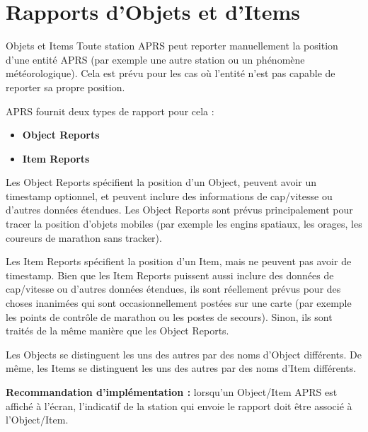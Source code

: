 \chapter[RAPPORTS D'OBJETS ET D'ITEMS]{Rapports d'Objets et d'Items}\label{rapports-dobjets-et-ditems}

\newcommand{\chElevenHead}[1]{\shortstack{\sffamily\bfseries\itshape #1}}
\newcommand{\chElevenDataExtHead}{%
  \makebox[\linewidth][c]{%
  \begin{tabular}{@{}>{\centering\arraybackslash\sffamily\bfseries\itshape}p{\dimexpr\linewidth+2\tabcolsep\relax}@{}}
  Course/Speed \\
  \hline
  Power/Height/Gain/Dir \\
  \hline
  Radio Range \\
  \hline
  DF Signal Strength \\
  \hline
  Area Object
  \end{tabular}}%
}
\newcommand{\chElevenBytes}[1]{%
  \makebox[0pt][r]{Bytes:\hspace{1.2em}}%
  \makebox[\linewidth][c]{#1}%
}
\newcommand{\chElevenExampleText}[1]{{\rmfamily\small #1}}

\begin{aprssideblock}{Objets et Items}
Toute station APRS peut reporter manuellement la position d'une entité
APRS (par exemple une autre station ou un phénomène météorologique). Cela
est prévu pour les cas où l'entité n'est pas capable de reporter sa propre
position.

APRS fournit deux types de rapport pour cela :

\begin{itemize}
\tightlist
\item
  \textbf{Object Reports}
\item
  \textbf{Item Reports}
\end{itemize}

Les Object Reports spécifient la position d'un Object, peuvent avoir un
timestamp optionnel, et peuvent inclure des informations de cap/vitesse ou
d'autres données étendues. Les Object Reports sont prévus principalement
pour tracer la position d'objets mobiles (par exemple les engins spatiaux,
les orages, les coureurs de marathon sans tracker).

Les Item Reports spécifient la position d'un Item, mais ne peuvent pas
avoir de timestamp. Bien que les Item Reports puissent aussi inclure des
données de cap/vitesse ou d'autres données étendues, ils sont réellement
prévus pour des choses inanimées qui sont occasionnellement postées sur
une carte (par exemple les points de contrôle de marathon ou les postes de
secours). Sinon, ils sont traités de la même manière que les Object
Reports.

Les Objects se distinguent les uns des autres par des noms d'Object
différents. De même, les Items se distinguent les uns des autres par des
noms d'Item différents.

\textbf{Recommandation d'implémentation :} lorsqu'un Object/Item APRS est
affiché à l'écran, l'indicatif de la station qui envoie le rapport doit
être associé à l'Object/Item.
\end{aprssideblock}

